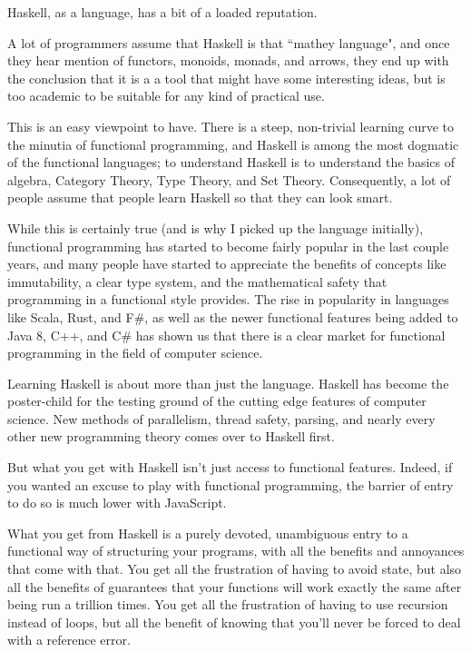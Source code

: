 \begin{foreword}

Haskell, as a language, has a bit of a loaded reputation.  

A lot of programmers assume that Haskell is that ``mathey language", and once they hear mention of functors, monoids, monads, and arrows, they end up with the conclusion that it is a a tool that might have some interesting ideas, but is too academic to be suitable for any kind of practical use. 

This is an easy viewpoint to have.  There is a steep, non-trivial learning curve to the minutia of functional programming, and Haskell is among the most dogmatic of the functional languages; to understand Haskell is to understand the basics of algebra, Category Theory, Type Theory, and Set Theory.  Consequently, a lot of people assume that people learn Haskell so that they can look smart. 

While this is certainly true (and is why I picked up the language initially), functional programming has started to become fairly popular in the last couple years, and many people have started to appreciate the benefits of concepts like immutability, a clear type system, and the mathematical safety that programming in a functional style provides. The rise in popularity in languages like Scala, Rust, and F\#, as well as the newer functional features being added to Java 8, C++, and C\# has shown us that there is a clear market for functional programming in the field of computer science. 

Learning Haskell is about more than just the language. Haskell has become the poster-child for the testing ground of the cutting edge features of computer science. New methods of parallelism, thread safety, parsing, and nearly every other new programming theory comes over to Haskell first. 

But what you get with Haskell isn't just access to functional features.  Indeed, if you wanted an excuse to play with functional programming, the barrier of entry to do so is much lower with JavaScript.  

What you get from Haskell is a purely devoted, unambiguous entry to a functional way of structuring your programs, with all the benefits and annoyances that come with that. You get all the frustration of having to avoid state, but also all the benefits of guarantees that your functions will work exactly the same after being run a trillion times. You get all the frustration of having to use recursion instead of loops, but all the benefit of knowing that you'll never be forced to deal with a  reference error. 


\end{foreword}
